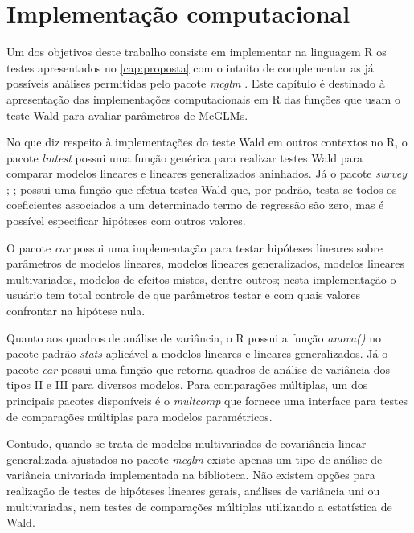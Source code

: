 
\chapter{Implementação computacional}

Um dos objetivos deste trabalho consiste em implementar na linguagem R os testes apresentados no \autoref{cap:proposta} com o intuito de complementar as já possíveis análises permitidas pelo pacote \emph{mcglm} \citep{mcglm}. Este capítulo é destinado à apresentação das implementações computacionais em R das funções que usam o teste Wald para avaliar parâmetros de McGLMs.

No que diz respeito à implementações do teste Wald em outros contextos no R, o pacote \emph{lmtest} \citep{lmtest} possui uma função genérica para realizar testes Wald para comparar modelos lineares e lineares generalizados aninhados. Já o pacote \emph{survey} \citep{survey1}; \citep{survey2};\citep{survey3} possui uma função que efetua testes Wald que, por padrão, testa se todos os coeficientes associados a um determinado termo de regressão são zero, mas é possível especificar hipóteses com outros valores. 

O pacote \emph{car} \citep{car} possui uma implementação para testar hipóteses lineares sobre parâmetros de modelos lineares, modelos lineares generalizados, modelos lineares multivariados, modelos de efeitos mistos, dentre outros; nesta implementação o usuário tem total controle de que parâmetros testar e com quais valores confrontar na hipótese nula. 

Quanto aos quadros de análise de variância, o R possui a função \emph{anova()} no pacote padrão \emph{stats} \citep{softwareR} aplicável a modelos lineares e lineares generalizados. Já o pacote \emph{car} \citep{car} possui uma função que retorna quadros de análise de variância dos tipos II e III para diversos modelos. Para comparações múltiplas, um dos principais pacotes disponíveis é o \emph{multcomp} \citep{multcomp} que fornece uma interface para testes de comparações múltiplas para modelos paramétricos.

Contudo, quando se trata de modelos multivariados de covariância linear generalizada ajustados no pacote \emph{mcglm} existe apenas um tipo de análise de variância univariada implementada na biblioteca. Não existem opções para realização de testes de hipóteses lineares gerais, análises de variância uni ou multivariadas, nem testes de comparações múltiplas utilizando a estatística de Wald. 


